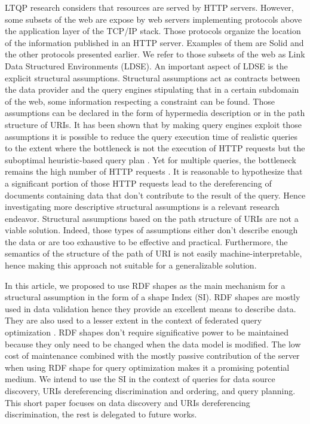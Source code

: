 LTQP research considers that resources are served by HTTP servers.
However, some subsets of the web are expose by web servers implementing protocols above the application layer of the TCP/IP stack.
Those protocols organize the location of the information published in an HTTP server.
Examples of them are Solid and the other protocols presented earlier.
We refer to those subsets of the web as Link Data Structured Environments (LDSE).
An important aspect of LDSE is the explicit structural assumptions.
Structural assumptions act as contracts between the data provider and 
the query engines stipulating that in a certain subdomain of the web, some information respecting a constraint can be found.
Those assumptions can be declared in the form of hypermedia description \cite{Fielding} or in the path structure of URIs.
It has been shown that by making query engines exploit those assumptions it is possible to reduce the query execution time
of realistic queries to the extent where the bottleneck is not the execution of 
HTTP requests but the suboptimal heuristic-based query plan \cite{eschauzier_quweda_2023, Taelman2023}.
Yet for multiple queries, the bottleneck remains the high number of HTTP requests  \cite{eschauzier_quweda_2023}.
It is reasonable to hypothesize that a significant portion of those HTTP requests lead to the dereferencing of
documents containing data that don't contribute to the result of the query.
Hence investigating more descriptive structural assumptions is a relevant research endeavor.
Structural assumptions based on the path structure of URIs are not a viable solution.
Indeed, those types of assumptions either don't describe enough the data or are too exhaustive to be effective and practical.
Furthermore, the semantics of the structure of the path of URI is not easily machine-interpretable, hence
making this approach not suitable for a generalizable solution.

In this article, we proposed to use RDF shapes as the main mechanism for a structural assumption in the form of a shape Index (SI).
RDF shapes are mostly used in data validation \cite{Gayo2018a} hence they provide an excellent means to describe data.
They are also used to a lesser extent in the context of federated query optimization \cite{kashif2021}.
RDF shapes don't require significative power to be maintained because they only need to be changed 
when the data model is modified.
The low cost of maintenance combined with the mostly passive contribution of 
the server when using RDF shape for query optimization makes it a promising potential medium. 
We intend to use the SI in the context of queries for data source discovery, URIs dereferencing discrimination and ordering, and query planning.
This short paper focuses on data discovery and URIs dereferencing discrimination,
the rest is delegated to future works.
